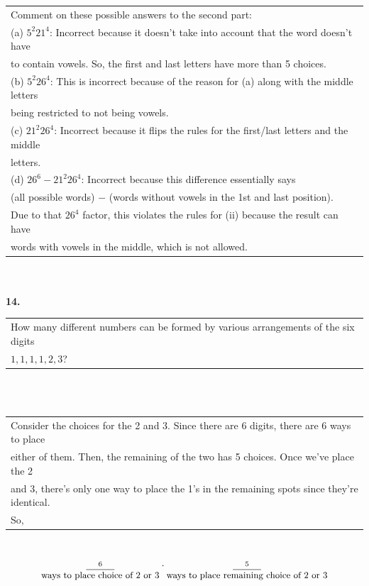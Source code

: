 \documentclass[12pt, letterpaper]{article}
\begin{document}
        \indent \indent \begin{tabular}[t]{l}
            Comment on these possible answers to the second part: \\
            \indent \indent (a) $5^{2}21^{4}$: Incorrect because it doesn't take into account that the word doesn't have \\
            \indent \indent \indent to contain vowels. So, the first and last letters have more than 5 choices. \\
            \indent \indent (b) $5^{2}26^{4}$: This is incorrect because of the reason for (a) along with the middle letters \\
            \indent \indent \indent being restricted to not being vowels. \\
            \indent \indent (c) $21^{2}26^{4}$: Incorrect because it flips the rules for the first/last letters and the middle \\
            \indent \indent \indent letters. \\
            \indent \indent (d) $26^{6} - 21^{2}26^{4}$: Incorrect because this difference essentially says \\
            \indent \indent \indent (all possible words) $-$ (words without vowels in the 1st and last position). \\
            \indent \indent \indent Due to that $26^{4}$ factor, this violates the rules for (ii) because the result can have \\
            \indent \indent \indent words with vowels in the middle, which is not allowed.
            \end{tabular} \\ \\
    \textbf{14.} \begin{tabular}[t]{l} 
        How many different numbers can be formed by various arrangements of the six digits \\
        $1, 1, 1, 1, 2, 3$?
        \end{tabular} \\ \\
        \indent \indent \begin{tabular}[t]{l}
            Consider the choices for the 2 and 3. Since there are 6 digits, there are 6 ways to place\\
            either of them. Then, the remaining of the two has 5 choices. Once we've place the 2\\
            and 3, there's only one way to place the 1's in the remaining spots since they're identical. \\
            So,
            \end{tabular} \\
            \[
            \underset{\text{\small ways to place choice of 2 or 3}}{\overset{6}{\underline{\hspace{1cm}}}} \cdot
            \underset{\text{\small ways to place remaining choice of 2 or 3}}{\overset{5}{\underline{\hspace{1cm}}}}
            \]
\end{document}
